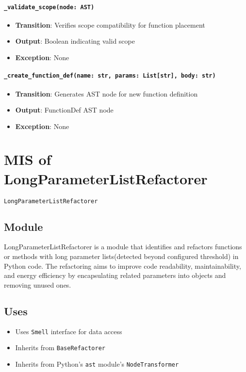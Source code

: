 \documentclass[12pt, titlepage]{article}
\begin{document}
\paragraph{\texttt{\_validate\_scope(node: AST)}}
\begin{itemize}
  \item \textbf{Transition}: Verifies scope compatibility for function placement
  \item \textbf{Output}: Boolean indicating valid scope
  \item \textbf{Exception}: None
\end{itemize}

\paragraph{\texttt{\_create\_function\_def(name: str, params: List[str], body: str)}}
\begin{itemize}
  \item \textbf{Transition}: Generates AST node for new function definition
  \item \textbf{Output}: FunctionDef AST node
  \item \textbf{Exception}: None
\end{itemize}


\section{MIS of LongParameterListRefactorer} \label{Module} 

\texttt{LongParameterListRefactorer}

\subsection{Module}

LongParameterListRefactorer is a module that identifies and refactors functions or methods with long parameter lists(detected beyond configured threshold) in Python code. The refactoring aims to improve code readability, maintainability, and energy efficiency by encapsulating related parameters into objects and removing unused ones.

\subsection{Uses}

\begin{itemize}
  \item Uses \texttt{Smell} interface for data access
  \item Inherits from \texttt{BaseRefactorer}
  \item Inherits from Python's \texttt{ast} module's \texttt{NodeTransformer}
\end{itemize}
\end{document}
